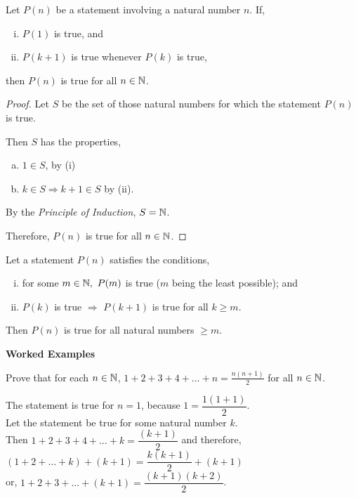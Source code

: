 \documentclass[11pt]{scrartcl}
\begin{document}
	\begin{theorem}
		Let $P(n)$ be a statement involving a natural number $n$. If,
		\begin{enumerate}[i)]
			\item $P(1)$ is true, and
			\item $P(k+1)$ is true whenever $P(k)$ is true,
		\end{enumerate}
		then $P(n)$ is true for all $n \in \mathbb N$.
	\end{theorem}

	\begin{proof}
		Let $S$ be the set of those natural numbers for which the statement $P(n)$ is true.
		
		Then $S$ has the properties,
		\begin{enumerate}[(a)]
			\item $1 \in S$, by (i)
			\item $k \in S \Rightarrow k+1 \in S$ by (ii).
		\end{enumerate}
	
		By the \emph{Principle of Induction}, $S = \mathbb N$.
		
		Therefore, $P(n)$ is true for all $n \in \mathbb N$.
	\end{proof}

	\begin{remark}
		Let a statement $P(n)$ satisfies the conditions,
		\begin{enumerate}[(i)]
			\item for some $m \in \mathbb N,\ P(m)$ is true ($m$ being the least possible); and
			\item $P(k)$ is true $\Rightarrow$ $P(k+1)$ is true for all $k \geq m$.
		\end{enumerate}
		Then $P(n)$ is true for all natural numbers $\geq m$.
	\end{remark}

	\pagebreak

	\begin{flushleft}
			\textbf{Worked Examples}
	\end{flushleft}
	\begin{example}
		Prove that for each $n \in \mathbb N$, $1+2+3+4+\dots +n = \frac{n(n+1)}{2}$ for all $n \in \mathbb N$.
	\end{example}

	The statement is true for $n=1$, because $1 = \dfrac{1(1+1)}{2}$.\\
	Let the statement be true for some natural number $k$.\\
	Then $1+2+3+4+\dots +k = \dfrac{(k+1)}{2}$ and therefore,\\
	$(1+2+\dots+k)+(k+1) = \dfrac{k(k+1)}{2} + (k+1)$\\
	or, $1 +2 +3 + \dots +(k+1) = \dfrac{(k+1)(k+2)}{2}$.
	
\end{document}

